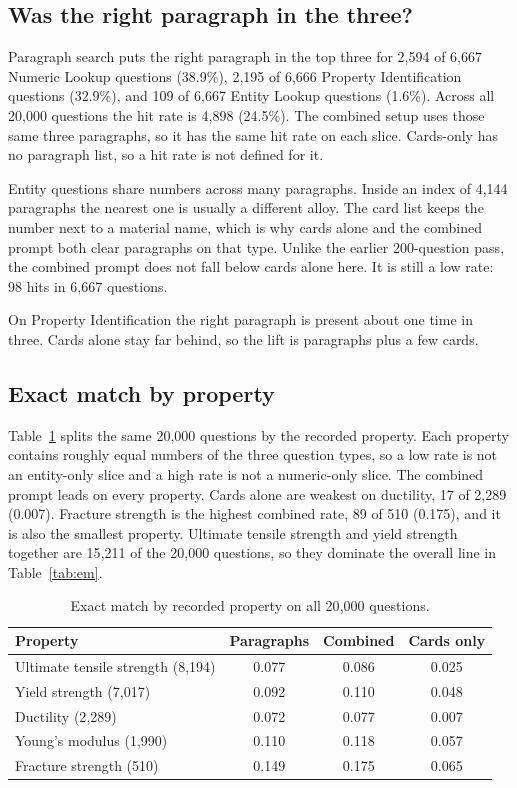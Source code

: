 \documentclass[conference]{IEEEtran}
\begin{document}
\subsection{Was the right paragraph in the three?}
Paragraph search puts the right paragraph in the top three for 2{,}594 of 6{,}667 Numeric Lookup questions (38.9\%), 2{,}195 of 6{,}666 Property Identification questions (32.9\%), and 109 of 6{,}667 Entity Lookup questions (1.6\%). Across all 20{,}000 questions the hit rate is 4{,}898 (24.5\%). The combined setup uses those same three paragraphs, so it has the same hit rate on each slice. Cards-only has no paragraph list, so a hit rate is not defined for it.

Entity questions share numbers across many paragraphs. Inside an index of 4{,}144 paragraphs the nearest one is usually a different alloy. The card list keeps the number next to a material name, which is why cards alone and the combined prompt both clear paragraphs on that type. Unlike the earlier 200-question pass, the combined prompt does not fall below cards alone here. It is still a low rate: 98 hits in 6{,}667 questions.

On Property Identification the right paragraph is present about one time in three. Cards alone stay far behind, so the lift is paragraphs plus a few cards.

\subsection{Exact match by property}
Table~\ref{tab:prop} splits the same 20{,}000 questions by the recorded property. Each property contains roughly equal numbers of the three question types, so a low rate is not an entity-only slice and a high rate is not a numeric-only slice. The combined prompt leads on every property. Cards alone are weakest on ductility, 17 of 2{,}289 (0.007). Fracture strength is the highest combined rate, 89 of 510 (0.175), and it is also the smallest property. Ultimate tensile strength and yield strength together are 15{,}211 of the 20{,}000 questions, so they dominate the overall line in Table~\ref{tab:em}.

\begin{table}[t]
\caption{Exact match by recorded property on all 20{,}000 questions.}
\label{tab:prop}
\centering
\begin{tabular}{lccc}
\toprule
Property & Paragraphs & Combined & Cards only \\
\midrule
Ultimate tensile strength (8{,}194) & 0.077 & 0.086 & 0.025 \\
Yield strength (7{,}017) & 0.092 & 0.110 & 0.048 \\
Ductility (2{,}289) & 0.072 & 0.077 & 0.007 \\
Young's modulus (1{,}990) & 0.110 & 0.118 & 0.057 \\
Fracture strength (510) & 0.149 & 0.175 & 0.065 \\
\bottomrule
\end{tabular}
\end{table}
\end{document}
